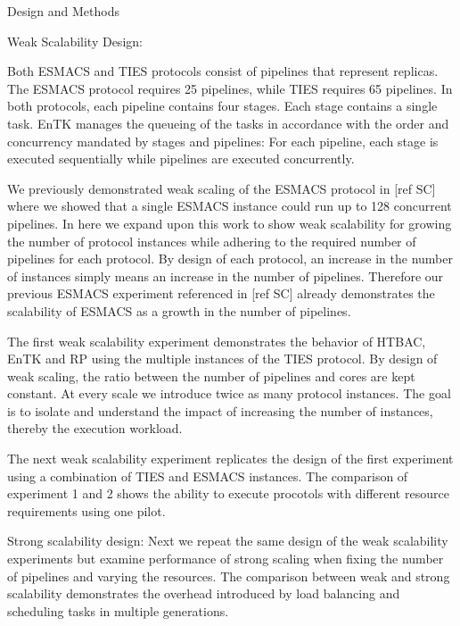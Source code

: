 Design and Methods

Weak Scalability Design:

Both ESMACS and TIES protocols consist of pipelines that represent replicas. The ESMACS protocol requires 25 pipelines, while TIES requires 65 pipelines. In both protocols, each pipeline contains four stages. Each stage contains a single task. EnTK manages the queueing of the tasks in accordance with the order and concurrency mandated by stages and pipelines: For each pipeline, each stage is executed sequentially while pipelines are executed concurrently.

We previously demonstrated weak scaling of the ESMACS protocol in [ref SC] where we showed that a single ESMACS instance could run up to 128 concurrent pipelines. In here we expand upon this work to show weak scalability for growing the number of protocol instances while adhering to the required number of pipelines for each protocol. By design of each protocol, an increase in the number of instances simply means an increase in the number of pipelines. Therefore our previous ESMACS experiment referenced in [ref SC] already demonstrates the scalability of ESMACS as a growth in the number of pipelines.

The first weak scalability experiment demonstrates the behavior of HTBAC, EnTK and RP using the multiple instances of
the TIES protocol. By design of weak scaling, the ratio between the number of pipelines and cores are kept constant. At every scale we introduce twice as many protocol instances. The goal is to isolate and understand
the impact of increasing the number of instances, thereby the execution workload.

The next weak scalability experiment replicates the design of the first experiment using a combination of TIES and ESMACS instances. The comparison of experiment 1 and 2 shows the ability to execute procotols with different resource requirements using one pilot.

Strong scalability design: Next we repeat the same design of the weak scalability experiments but examine performance of strong scaling when fixing the number of pipelines and varying the resources. The comparison between weak and strong scalability demonstrates the overhead introduced by load balancing and scheduling tasks in multiple generations.


